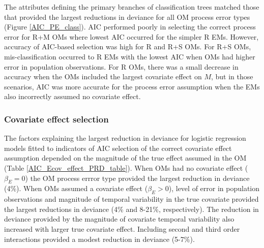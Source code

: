 \documentclass[
  12pt,
]{article}
\begin{document}
The attributes defining the primary branches of classification trees matched those that provided the largest reductions in deviance for all OM process error types (Figure \ref{AIC_PE_class}). AIC performed poorly in selecting the correct process error for R+M OMs where lowest AIC occurred for the simpler R EMs. However, accuracy of AIC-based selection was high for R and R+S OMs. For R+S OMs, mis-classification occurred to R EMs with the lowest AIC when OMs had higher error in population observations. For R OMs, there was a small decrease in accuracy when the OMs included the largest covariate effect on \(M\), but in those scenarios, AIC was more accurate for the process error assumption when the EMs also incorrectly assumed no covariate effect.

\subsubsection*{Covariate effect selection}\label{covariate-effect-selection}

The factors explaining the largest reduction in deviance for logistic regression models fitted to indicators of AIC selection of the correct covariate effect assumption depended on the magnitude of the true effect assumed in the OM (Table \ref{AIC_Ecov_effect_PRD_table}). When OMs had no covariate effect (\(\beta_E = 0\)) the OM process errror type provided the largest reduction in deviance (4\%). When OMs assumed a covariate effect (\(\beta_E>0\)), level of error in population observations and magnitude of temporal variability in the true covariate provided the largest reductions in deviance (4\% and 8-21\%, respectively). The reduction in deviance provided by the magnitude of covariate temporal variability also increased with larger true covariate effect. Including second and third order interactions provided a modest reduction in deviance (5-7\%).
\end{document}
